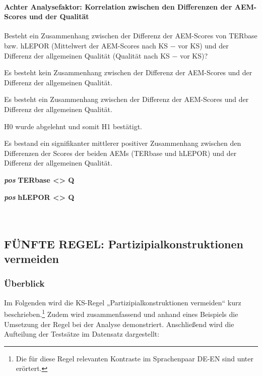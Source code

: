 \paragraph*{Achter Analysefaktor: Korrelation zwischen den Differenzen der AEM-Scores und der Qualität}
\begin{description}[font=\normalfont\bfseries]
\item [Fragestellung:] Besteht ein Zusammenhang zwischen der Differenz der AEM-Scores von TERbase bzw. hLEPOR (Mittelwert der AEM-Scores nach KS $-$ vor KS) und der Differenz der allgemeinen Qualität (Qualität nach KS $-$ vor KS)?
\item [H0 --] Es besteht kein Zusammenhang zwischen der Differenz der AEM-Scores und der Differenz der allgemeinen Qualität.
\item [H1 --] Es besteht ein Zusammenhang zwischen der Differenz der AEM-Scores und der Differenz der allgemeinen Qualität.
\item [Resultat]
\end{description}
\noindent
\parbox[t]{.7\textwidth}{
H0 wurde abgelehnt und somit H1 bestätigt.

Es bestand ein signifikanter mittlerer positiver Zusammenhang zwischen den Differenzen der Scores der beiden AEMs (TERbase und hLEPOR) und der Differenz der allgemeinen Qualität.
}
\parbox[t]{.04\textwidth}{}
\colorbox{smGreen}{\parbox[t]{.25\textwidth}{
{ \textbf{\textit{pos}} \textbf{TERbase <> Q}}

 \textbf{\textit{pos}} \textbf{hLEPOR <> Q}\\
 \\
 \\
}}



\subsection{FÜNFTE REGEL: Partizipialkonstruktionen vermeiden}
\label{sec:5.3.5}

 \subsubsection{\label{sec:5.3.5.0}Überblick}

Im Folgenden wird die KS-Regel „Partizipialkonstruktionen vermeiden“ kurz beschrieben.\footnote{\textrm{Die für diese Regel relevanten Kontraste im Sprachenpaar DE-EN sind unter  erörtert.} } Zudem wird zusammenfassend und anhand eines Beispiels die Umsetzung der Regel bei der Analyse demonstriert. Anschließend wird die Aufteilung der Testsätze im Datensatz dargestellt:

